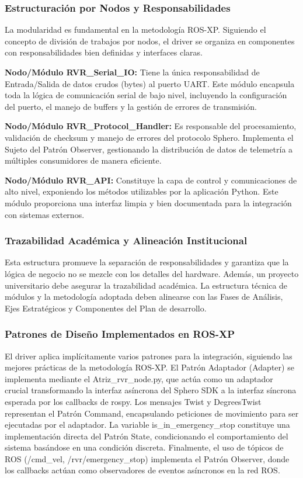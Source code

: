 \documentclass[11pt]{article}
\newcommand{\code}[1]{\textcolor{codeblue}{\url{#1}}}
\numberwithin{figure}{section}
\numberwithin{table}{section}
\def\code#1{#1}%
\begin{document}
\subsubsection{Estructuración por Nodos y Responsabilidades}

La modularidad es fundamental en la metodología ROS-XP. Siguiendo el concepto de división de trabajos por nodos, el driver se organiza en componentes con responsabilidades bien definidas y interfaces claras.

\textbf{Nodo/Módulo \code{RVR\_Serial\_IO}:} Tiene la única responsabilidad de Entrada/Salida de datos crudos (bytes) al puerto UART. Este módulo encapsula toda la lógica de comunicación serial de bajo nivel, incluyendo la configuración del puerto, el manejo de buffers y la gestión de errores de transmisión.

\textbf{Nodo/Módulo \code{RVR\_Protocol\_Handler}:} Es responsable del procesamiento, validación de checksum y manejo de errores del protocolo Sphero. Implementa el Sujeto del Patrón Observer, gestionando la distribución de datos de telemetría a múltiples consumidores de manera eficiente.

\textbf{Nodo/Módulo \code{RVR\_API}:} Constituye la capa de control y comunicaciones de alto nivel, exponiendo los métodos utilizables por la aplicación Python. Este módulo proporciona una interfaz limpia y bien documentada para la integración con sistemas externos.


\subsubsection{Trazabilidad Académica y Alineación Institucional}

Esta estructura promueve la separación de responsabilidades y garantiza que la lógica de negocio no se mezcle con los detalles del hardware. Además, un proyecto universitario debe asegurar la trazabilidad académica. La estructura técnica de módulos y la metodología adoptada deben alinearse con las Fases de Análisis, Ejes Estratégicos y Componentes del Plan de desarrollo.


\subsubsection{Patrones de Diseño Implementados en ROS-XP}

El driver aplica implícitamente varios patrones para la integración, siguiendo las mejores prácticas de la metodología ROS-XP. El Patrón Adaptador (Adapter) se implementa mediante el \code{Atriz\_rvr\_node.py}, que actúa como un adaptador crucial transformando la interfaz asíncrona del Sphero SDK a la interfaz síncrona esperada por los callbacks de rospy. Los mensajes Twist y DegreesTwist representan el Patrón Command, encapsulando peticiones de movimiento para ser ejecutadas por el adaptador. La variable \code{is\_in\_emergency\_stop} constituye una implementación directa del Patrón State, condicionando el comportamiento del sistema basándose en una condición discreta. Finalmente, el uso de tópicos de ROS (\code{/cmd\_vel}, \code{/rvr/emergency\_stop}) implementa el Patrón Observer, donde los callbacks actúan como observadores de eventos asíncronos en la red ROS.
\end{document}
